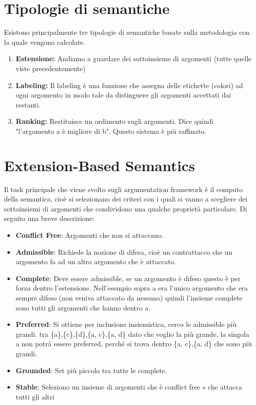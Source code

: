 \section{Tipologie di semantiche}
Esistono principalmente tre tipologie di semantiche basate sulla metodologia
con la quale vengono calcolate.
\begin{enumerate}
    \item \textbf{Estensione:} Andiamo a guardare dei sottoinsieme di
          argomenti (tutte quelle viste precedentemente)
    \item \textbf{Labeling:} Il labeling è una funzione che assegna delle
          etichette (colori) ad ogni argomento in modo tale da distinguere gli
          argomenti accettati dai restanti.
    \item \textbf{Ranking:} Restituisce un ordimento sugli argomenti. Dice
          quindi "l'argomento a è migliore di b". Questo sistema è più raffinato.
\end{enumerate}

\section{Extension-Based Semantics}
Il task principale che viene svolto sugli argumentation framework è il computo
della semantica, cioè si selezionano dei criteri con i quali si vanno a
scegliere dei sottoinsiemi di argomenti che condividono una qualche proprietà
particolare. Di seguito una breve descrizione:
\begin{itemize}
    \item \textbf{Conflict Free}: Argomenti che non si attaccano.
    \item \textbf{Admissible}: Richiede la nozione di difesa, cioè un
          contrattacco che un argomento fa ad un altro argomento che è attaccato.
    \item \textbf{Complete}: Deve essere admissible, se un argomento è
          difeso questo è per forza dentro l'estensione. Nell'esempio sopra a era
          l'unico argomento che era sempre difeso (non veniva attaccato da
          nessuno) quindi l'insieme complete sono tutti gli argomenti che hanno
          dentro a.
    \item \textbf{Preferred}: Si ottiene per inclusione insiemistica, cerco
          le admissible più grandi. tra \{a\},\{c\},\{d\},\{a, c\},\{a, d\} dato
          che voglio la più grande, la singola {a} non potrà essere preferred,
          perché si trova dentro \{a, c\},\{a, d\} che sono più grandi.
    \item \textbf{Grounded}: Set più piccolo tra tutte le complete.
    \item \textbf{Stable}: Seleziono un insieme di argomenti che è conflict
          free e che attacca tutti gli altri
\end{itemize}

